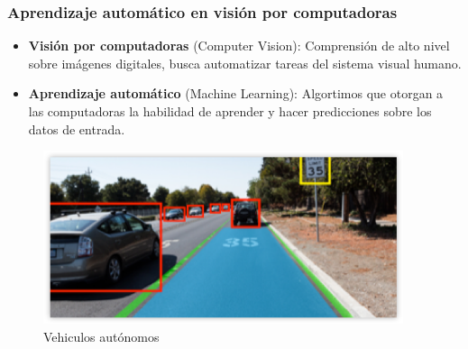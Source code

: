 \documentclass[10pt,center]{beamer}
\begin{document}
\begin{frame}
  \frametitle{Aprendizaje automático en visión por computadoras}
  \begin{itemize}
    \item \textbf{Visión por computadoras} (Computer Vision): Comprensión de alto nivel sobre imágenes digitales, busca automatizar tareas del sistema visual humano.
    \item \textbf{Aprendizaje automático} (Machine Learning): Algortimos que otorgan a las computadoras la habilidad de aprender y hacer predicciones sobre los datos de entrada. 
  \end{itemize}

  
    \begin{figure}[H]
      \begin{center}
	\includegraphics[height=0.4\textheight]{./img/nvidia_car_detection.png}
      \end{center}
      \caption{Vehiculos autónomos}
    \end{figure}    
\end{frame}
  
\end{document}
